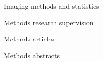 \documentclass{cv}
\begin{document}
\begin{cvSection}{Imaging methods and statistics}
\begin{cvSubSection}{Methods research supervision}
\end{cvSubSection}

\begin{cvSubSection}{Methods articles}

\printbibliography[heading=none,
    keyword=methods,
    keyword=article,
notkeyword=omit]

\end{cvSubSection}

\begin{cvSubSection}{Methods abstracts}

\printbibliography[heading=none,
    keyword=methods,
    keyword=abstract,
notkeyword=omit]

\end{cvSubSection}

\end{cvSection}
\end{document}
